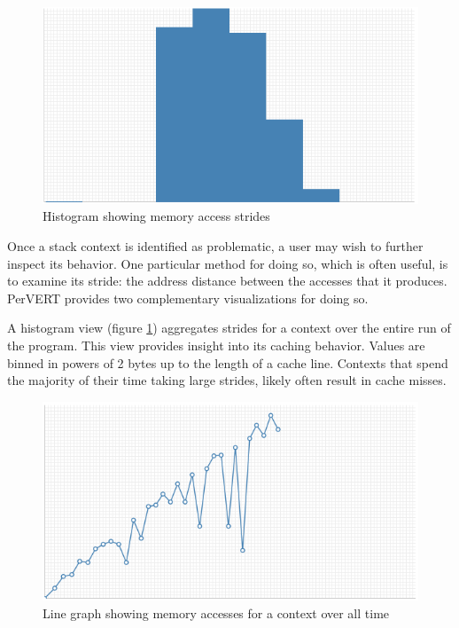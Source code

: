 \documentclass[annual]{acmsiggraph}
\begin{document}
  	\begin{figure}[t]
  		\centering
      \includegraphics[scale=0.40]{images/histo.png}
  		\caption{Histogram showing memory access strides}
      \label{fig:histo}
  	\end{figure}


    Once a stack context is identified as problematic, a user may wish to further inspect its behavior.
    One particular method for doing so, which is often useful, is to examine its stride:
      the address distance between the accesses that it produces.
    PerVERT provides two complementary visualizations for doing so.

    A histogram view (figure \ref{fig:histo}) aggregates strides for a context over the entire run of the program.
    This view provides insight into its caching behavior.
    Values are binned in powers of 2 bytes up to the length of a cache line.
    Contexts that spend the majority of their time taking large strides, likely often result in cache misses.
    
    \begin{figure}[t]
  		\centering
      \includegraphics[scale=0.40]{images/line.png}
  		\caption{Line graph showing memory accesses for a context over all time}
      \label{fig:line}
  	\end{figure}
\end{document}

